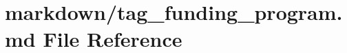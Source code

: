 \hypertarget{tag__funding__program_8md}{}\section{markdown/tag\+\_\+funding\+\_\+program.md File Reference}
\label{tag__funding__program_8md}
